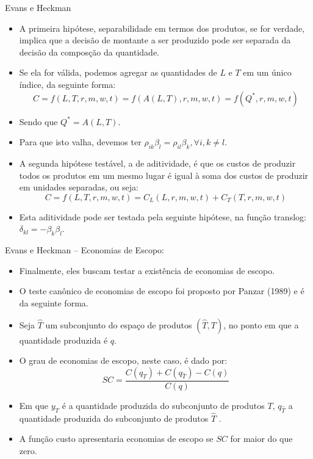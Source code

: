 \documentclass{beamer}
\begin{document}
\begin{frame}{Evans e Heckman}
\small
\begin{itemize}
\item A primeira hipótese, separabilidade em termos dos produtos, se for
verdade, implica que a decisão de montante a ser produzido pode ser
separada da decisão da composção da quantidade. 
\item Se ela for válida, podemos agregar as quantidades de $L$ e $T$ em
um único índice, da seguinte forma:
\[
C=f(L,T,r,m,w,t)=f(A(L,T),r,m,w,t)=f(Q^{*},r,m,w,t)
\]
\item Sendo que $Q^{*}=A(L,T)$. 
\item Para que isto valha, devemos ter $\rho_{ik}\beta_{l}=\rho_{il}\beta_{k},\forall i,k\neq l$. 
\item A segunda hipótese testável, a de aditividade, é que os custos de
produzir todos os produtos em um mesmo lugar é igual à soma dos custos
de produzir em unidades separadas, ou seja:
\[
C=f(L,T,r,m,w,t)=C_{L}(L,r,m,w,t)+C_{T}(T,r,m,w,t)
\]
\item Esta aditividade pode ser testada pela seguinte hipótese, na função
translog: $\delta_{kl}=-\beta_{k}\beta_{l}$. 
\end{itemize}


\end{frame}

\begin{frame}{Evans e Heckman -- Economias de Escopo:}

\begin{itemize}
\item Finalmente, eles buscam testar a existência de economias de escopo. 
\item O teste canônico de economias de escopo foi proposto por Panzar (1989)
e é da seguinte forma. 
\item Seja $\hat{T}$ um subconjunto do espaço de produtos $(\hat{T},T)$,
no ponto em que a quantidade produzida é $q$. 
\item O grau de economias de escopo, neste caso, é dado por:
\[
SC=\frac{C(q_{T})+C(q_{\hat{T}})-C(q)}{C(q)}
\]
\item Em que $y_{T}$ é a quantidade produzida do subconjunto de produtos
$T$, $q_{\hat{T}}$ a quantidade produzida do subconjunto de produtos
$\hat{T}$ . 
\item A função custo apresentaria economias de escopo se $SC$ for maior
do que zero. 
\end{itemize}
\end{frame}
\end{document}
